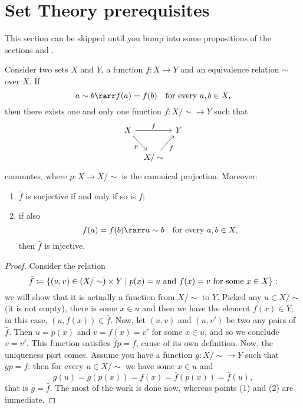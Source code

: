 
\section{Set Theory prerequisites}

\begin{note}
This section can be skipped until you bump into some propositions of the sections  and .
\end{note}

\begin{proposition}\label{proposition:SetIso1}
Consider two sets \(X\) and \(Y\), a function \(f : X \to Y\) and an equivalence relation \(\sim\) over \(X\). If
\[a \sim b \rarr f(a) = f(b) \quad\text{for every } a, b \in X ,\]
then there exists one and only one function \(\bar f : X/\sim \to Y\) such that
\[\begin{tikzcd}[column sep=tiny]
X \ar["f", rr] \ar["p", swap, dr] & & Y \\
& X/\sim \ar["{\bar f}", swap, ur]
\end{tikzcd}\]
commutes, where \(p : X \to X/\sim\) is the canonical projection. Moreover: 
\begin{enumerate}
\item \(\bar f\) is surjective if and only if so is \(f\);
\item if also
\[f(a) = f(b) \rarr a \sim b \quad\text{for every } a, b \in X ,\]
then \(\bar f\) is injective.
\end{enumerate}
\end{proposition}

\begin{proof}
Consider the relation
\[\bar f \coloneq \left\{(u, v) \in \mathcal (X/\sim) \times Y \mid p(x) = u \text{ and } f(x) = v \text{ for some } x \in X\right\} :\]
we will show that it is actually a function from \(X/\sim\) to \(Y\). Picked any \(u \in X/\sim\) (it is not empty), there is some \(x \in u\) and then we have the element \(f(x) \in Y\); in this case, \((u, f(x)) \in \bar f\). Now, let \((u, v)\) and \((u, v')\) be two any pairs of \(\bar f\). Then \(u = p(x)\) and \(v = f(x) = v'\) for some \(x \in u\), and so we conclude \(v = v'\). This function satisfies \(\bar f p = f\), cause of its own definition.\newline
Now, the uniqueness part comes. Assume you have a function \(g : X/\sim \to Y\) such that \(gp = f\): then for every \(u \in X/\sim\) we have some \(x \in u\) and
\[g(u) = g(p(x)) = f(x) = \bar f (p(x)) = \bar f(u) ,\]
that is \(g = \bar f\).\newline
The most of the work is done now, whereas points (1) and (2) are immediate.
\end{proof}

